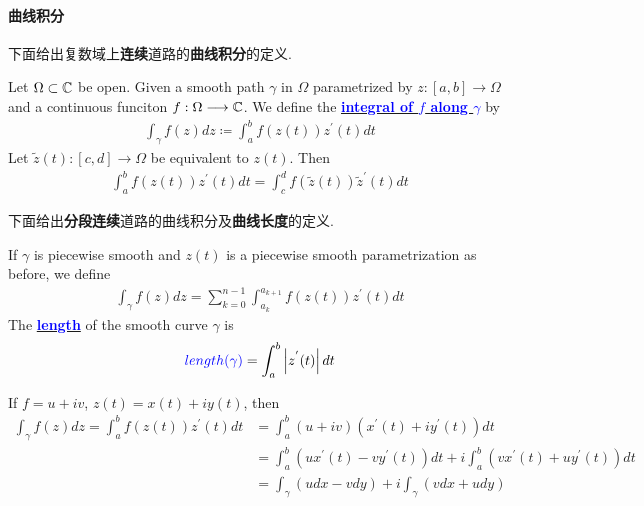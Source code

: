 \newpage
\paragraph{曲线积分}
下面给出复数域上\textbf{连续}道路的\textbf{曲线积分}的定义.
\begin{defn}\label{def 4.1.2}
	Let $\Omega \subset \mathbb{C}$ be open. Given a smooth path $\gamma$ in $\Omega$ parametrized by $z : [a , b] \longrightarrow \Omega$ and a continuous funciton $f : \Omega \longrightarrow \mathbb{C}$. We define the \underline{\textcolor{blue}{\textbf{integral of $f$ along $\gamma$}}} by
	\begin{align}
		\int_{\gamma}{f(z) dz} \coloneqq \int_{a}^{b}{f(z(t)) z^{'}(t) dt}
	\end{align}
	Let $\widetilde{z}(t) : [c , d] \longrightarrow \Omega$ be equivalent to $z(t)$. Then
	\begin{align}
		\int_{a}^{b}{f(z(t)) z^{'}(t) dt} = \int_{c}^{d}{f(\widetilde{z}(t)) \widetilde{z}^{'}(t) dt}
	\end{align}
\end{defn}

\vspace{2em}
下面给出\textbf{分段连续}道路的曲线积分及\textbf{曲线长度}的定义.
\begin{defn}\label{def 4.1.3}
	If $\gamma$ is piecewise smooth and $z(t)$ is a piecewise smooth parametrization as before, we define
	\begin{align}
		\int_{\gamma}{f(z) dz} = \sum_{k = 0}^{n - 1}{\int_{a_{k}}^{a_{k + 1}}{f(z(t)) z^{'}(t) dt}}
	\end{align}
	The \underline{\textcolor{blue}{\textbf{length}}} of the smooth curve $\gamma$ is 
	\begin{align}
		\textcolor{blue}{length(\gamma)} = \int_{a}^{b}{\left| z^{'}(t) \right| dt}
	\end{align}
\end{defn}

\vspace{2em}
If $f = u + i v$, $z(t) = x(t) + i y(t)$, then
\begin{align}
	\int_{\gamma}{f(z) dz} 
	= \int_{a}^{b}{f(z(t)) z^{'}(t) dt} 
	&= \int_{a}^{b}{(u + iv)(x^{'}(t) + i y^{'}(t)) dt} \\
	&= \int_{a}^{b}{(ux^{'}(t) - vy^{'}(t)) dt} + i \int_{a}^{b}{(vx^{'}(t) + uy^{'}(t)) dt} \\
	&= \int_{\gamma}{(udx - vdy)} + i \int_{\gamma}{(vdx + udy)}
\end{align}

